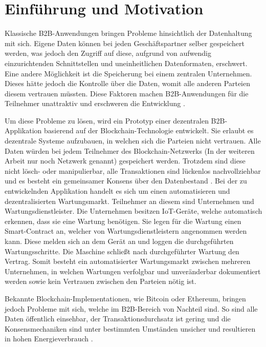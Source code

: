 \chapter{Einführung und Motivation}
\label{cha:einfuehrung}


Klassische B2B-Anwendungen bringen Probleme hinsichtlich der Datenhaltung mit sich. Eigene Daten können bei jeden Geschäftspartner selber gespeichert werden, was jedoch den Zugriff auf diese, aufgrund von aufwendig einzurichtenden Schnittstellen und uneinheitlichen Datenformaten, erschwert. Eine andere Möglichkeit ist die Speicherung bei einem zentralen Unternehmen. Dieses hätte jedoch die Kontrolle über die Daten, womit alle anderen Parteien diesem vertrauen müssten. Diese Faktoren machen B2B-Anwendungen für die Teilnehmer unattraktiv und erschweren die Entwicklung \cite{KorpelaDigitalSupplyChain2017} \cite{WustyouneedBlockchain2017}.

Um diese Probleme zu lösen, wird ein Prototyp einer dezentralen B2B-Applikation basierend auf der Blockchain-Technologie entwickelt. Sie erlaubt es dezentrale Systeme aufzubauen, in welchen sich die Parteien nicht vertrauen. Alle Daten würden bei jedem Teilnehmer des Blockchain-Netzwerks (In der weiteren Arbeit nur noch Netzwerk genannt) gespeichert werden. Trotzdem sind diese nicht lösch- oder manipulierbar, alle Transaktionen sind lückenlos nachvollziehbar und es besteht ein gemeinsamer Konsens über den Datenbestand \cite{CrosbyBlockChainTechnologyBitcoin2016}. Bei der zu entwickelnden Applikation handelt es sich um einen automatisieren und dezentralisierten Wartungsmarkt. Teilnehmer an diesem sind Unternehmen und Wartungsdienstleister. Die Unternehmen besitzen IoT-Geräte, welche automatisch erkennen, dass sie eine Wartung benötigen. Sie legen für die Wartung einen Smart-Contract an, welcher von Wartungsdienstleistern angenommen werden kann. Diese melden sich an dem Gerät an und loggen die durchgeführten Wartungsschritte. Die Maschine schließt nach durchgeführter Wartung den Vertrag. Somit besteht ein automatisierter Wartungsmarkt zwischen mehreren Unternehmen, in welchen Wartungen verfolgbar und unveränderbar dokumentiert werden sowie kein Vertrauen zwischen den Parteien nötig ist.

Bekannte Blockchain-Implementationen, wie Bitcoin oder Ethereum, bringen jedoch Probleme mit sich, welche im B2B-Bereich von Nachteil sind. So sind alle Daten öffentlich einsehbar, der Transaktionsdurchsatz ist gering und die Konsensmechaniken sind unter bestimmten Umständen unsicher und resultieren in hohen Energieverbrauch \cite{AntonopoulosMasteringbitcoin2015}\cite{NakamotoBitcoinPeertoPeerElectronic2008}\cite{EthereumTeamEthereumWhitePaper2017}. 

